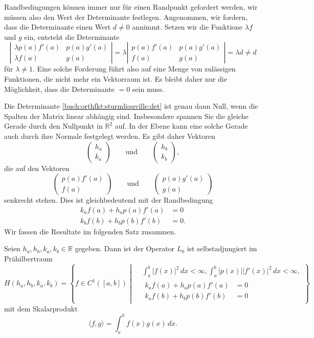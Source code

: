 Randbedingungen können immer nur für einen Randpunkt gefordert
werden, wir müssen also den Wert der Determinante festlegen.
Angenommen, wir fordern, dass die Determinante einen Wert
$d\ne 0$ annimmt. Setzen wir die Funktione $\lambda f$ und $g$ ein,
entsteht die Determinante
\[
\left|\begin{matrix}
\lambda p(a)f'(a)&p(a)g'(a) \\
\lambda f(a) &g(a)
\end{matrix}\right|
=
\lambda
\left|\begin{matrix}
p(a)f'(a)&p(a)g'(a) \\
f(a) &g(a)
\end{matrix}\right|
=
\lambda d \ne d
\]
für $\lambda \ne 1$.
Eine solche Forderung führt also auf eine Menge von zulässigen Funktionen,
die nicht mehr ein Vektorraum ist.
Es bleibt daher nur die Möglichkeit, dass die Determinante $=0$ sein muss.

Die Determinante 
\eqref{buch:orthfkt:sturmliouville:det}
ist genau dann Null, wenn die Spalten der Matrix linear abhängig sind.
Insbesondere spannen Sie die gleiche Gerade durch den Nullpunkt
in $\mathbb{R}^2$ auf.
In der Ebene kann eine solche Gerade auch durch ihre Normale festgelegt
werden.
Es gibt daher Vektoren
\[
\begin{pmatrix}
h_a\\
k_a
\end{pmatrix}
\qquad\text{und}\qquad
\begin{pmatrix}
h_b\\
k_b
\end{pmatrix},
\]
die auf den Vektoren
\[
\begin{pmatrix}
p(a)f'(a)\\
f(a)
\end{pmatrix}
\qquad\text{und}\qquad
\begin{pmatrix}
p(a)g'(a)\\
g(a)
\end{pmatrix}
\]
senkrecht stehen.
Dies ist gleichbedeutend mit der Randbedingung
\begin{align*}
k_af(a) + h_ap(a)f'(a)&=0
\\
k_bf(b) + h_bp(b)f'(b)&=0.
\end{align*}
Wir fassen die Resultate im folgenden Satz zusammen.

\begin{satz}
Seien $h_a, h_b, k_a, k_b\in \mathbb{R}$ gegeben.
Dann ist der Operator $L_0$ ist selbstadjungiert im Prähilbertraum
\begin{equation}
H(h_a,h_b,k_a,k_b)
=
\left\{
f \in C^1([a,b])
\;
\left|
\;
\begin{aligned}
&\int_a^b |f(x)|^2\,dx < \infty,
\int_a^b |p(x)| |f'(x)|^2\,dx < \infty,
\\
&
\begin{aligned}
k_af(a) + h_ap(a)f'(a) &= 0 \\
k_af(b) + h_bp(b)f'(b) &= 0 
\end{aligned}
\end{aligned}
\right.
\right\}
\label{buch:orthfkt:sturmliouvill:ph}
\end{equation}
mit dem Skalarprodukt
\[
\langle f,g\rangle = \int_a^b f(x)g(x)\,dx.
\]
\end{satz}

